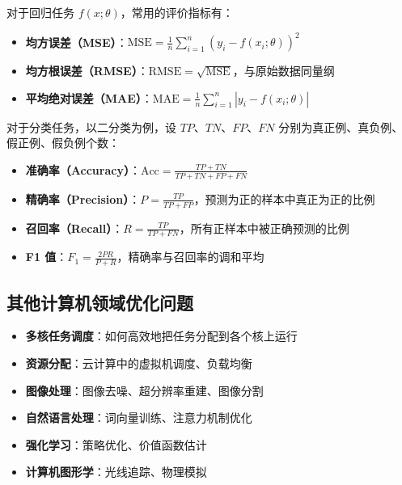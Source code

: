 \begin{conceptbox}[回归问题的评价指标]
对于回归任务 $f(x; \theta)$，常用的评价指标有：
\begin{itemize}[itemsep=0.3em]
    \item \textbf{均方误差（MSE）}：$\displaystyle\text{MSE} = \frac{1}{n}\sum_{i=1}^{n}(y_i - f(x_i; \theta))^2$
    \item \textbf{均方根误差（RMSE）}：$\text{RMSE} = \sqrt{\text{MSE}}$，与原始数据同量纲
    \item \textbf{平均绝对误差（MAE）}：$\displaystyle\text{MAE} = \frac{1}{n}\sum_{i=1}^{n}|y_i - f(x_i; \theta)|$
\end{itemize}
\end{conceptbox}

\begin{conceptbox}[分类问题的评价指标]
对于分类任务，以二分类为例，设 $TP$、$TN$、$FP$、$FN$ 分别为真正例、真负例、假正例、假负例个数：
\begin{itemize}[itemsep=0.3em]
    \item \textbf{准确率（Accuracy）}：$\displaystyle\text{Acc} = \frac{TP + TN}{TP + TN + FP + FN}$
    \item \textbf{精确率（Precision）}：$\displaystyle P = \frac{TP}{TP + FP}$，预测为正的样本中真正为正的比例
    \item \textbf{召回率（Recall）}：$\displaystyle R = \frac{TP}{TP + FN}$，所有正样本中被正确预测的比例
    \item \textbf{F1 值}：$\displaystyle F_1 = \frac{2PR}{P + R}$，精确率与召回率的调和平均
\end{itemize}
\end{conceptbox}

\subsection{其他计算机领域优化问题}

\begin{conceptbox}[典型优化问题]
\begin{itemize}[itemsep=0.3em]
    \item \textbf{多核任务调度}：如何高效地把任务分配到各个核上运行
    \item \textbf{资源分配}：云计算中的虚拟机调度、负载均衡
    \item \textbf{图像处理}：图像去噪、超分辨率重建、图像分割
    \item \textbf{自然语言处理}：词向量训练、注意力机制优化
    \item \textbf{强化学习}：策略优化、价值函数估计
    \item \textbf{计算机图形学}：光线追踪、物理模拟
\end{itemize}
\end{conceptbox}


